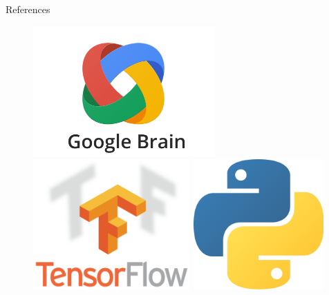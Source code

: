 \documentclass[22pt]{beamer}
\begin{document}
\begin{frame}[fragile]
\begin{textblock}{7.25}
\begin{block}{References}

{\scriptsize
}
\end{block}

\begin{figure}[htbp]
\centering
\includegraphics[height=5cm]{googlebrain-logo.png}
\hspace{1cm}
\includegraphics[height=5cm]{tensorflow-logo.png}
\hspace{1cm}
\includegraphics[height=5cm]{python-logo.png}

\end{figure}
\end{textblock}
\end{frame}
\end{document}
